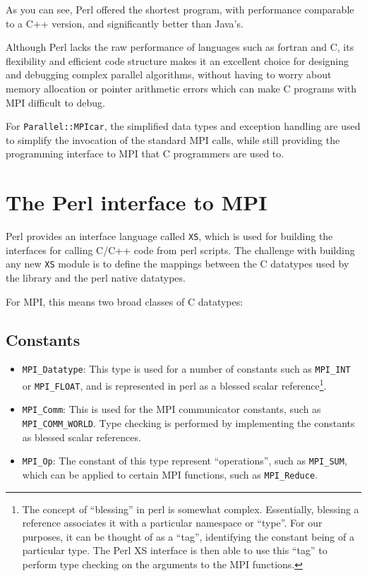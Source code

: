 \documentclass{report}
\begin{document}
As you can see, Perl offered the shortest program, with performance
comparable to a C++ version, and significantly better than Java's.

Although Perl lacks the raw performance of languages such as fortran
and C, its flexibility and efficient code structure makes it an
excellent choice for designing and debugging complex parallel
algorithms, without having to worry about memory allocation or pointer 
arithmetic errors which can make C programs with MPI difficult to debug.

For \verb|Parallel::MPIcar|, the simplified data types and exception
handling are used to simplify the invocation of the standard MPI
calls, while still providing the programming interface to MPI that C
programmers are used to.

\section*{The Perl interface to MPI}

Perl provides an interface language called \verb|XS|, which is used
for building the interfaces for calling C/C++ code from perl scripts.
The challenge with building any new \verb|XS| module is to define the
mappings between the C datatypes used by the library and the perl
native datatypes.

For MPI, this means two broad classes of C datatypes:

\subsection*{Constants} %
     \begin{itemize}
     \item \verb|MPI_Datatype|:  This type is used for a number of
constants such as \verb|MPI_INT| or \verb|MPI_FLOAT|, and is
represented in perl as a blessed scalar reference\footnote{The concept of
``blessing'' in perl is somewhat complex.  Essentially, blessing a
reference associates it with a particular namespace or ``type''.   For
our purposes, it can be thought of as a ``tag'', identifying the
constant being of a particular type.  The Perl XS interface is then
able to use this ``tag'' to perform type checking on the arguments to the
MPI functions. }. 
  
     \item \verb|MPI_Comm|: This is used for the MPI communicator
constants, such as \verb|MPI_COMM_WORLD|.  Type checking is performed
by implementing the constants as blessed scalar references.

     \item \verb|MPI_Op|: The constant of this type represent
``operations'', such as \verb|MPI_SUM|, which can be applied to
certain MPI functions, such as \verb|MPI_Reduce|.
     \end{itemize}
\end{document}
